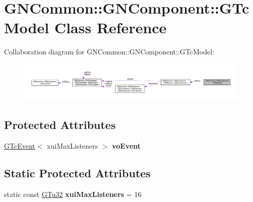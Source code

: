 \hypertarget{class_g_n_common_1_1_g_n_component_1_1_g_tc_model}{}\section{G\+N\+Common\+:\+:G\+N\+Component\+:\+:G\+Tc\+Model Class Reference}
\label{class_g_n_common_1_1_g_n_component_1_1_g_tc_model}


Collaboration diagram for G\+N\+Common\+:\+:G\+N\+Component\+:\+:G\+Tc\+Model\+:\nopagebreak
\begin{figure}[H]
\begin{center}
\leavevmode
\includegraphics[width=350pt]{class_g_n_common_1_1_g_n_component_1_1_g_tc_model__coll__graph}
\end{center}
\end{figure}
\subsection*{Protected Attributes}
\begin{DoxyCompactItemize}
\item 
\mbox{\label{class_g_n_common_1_1_g_n_component_1_1_g_tc_model_a8409e444177e68c91f5d8d6ece61a881}} 
\mbox{\hyperlink{class_g_n_common_1_1_g_n_component_1_1_g_tc_event}{G\+Tc\+Event}}$<$ xui\+Max\+Listeners $>$ {\bfseries vo\+Event}
\end{DoxyCompactItemize}
\subsection*{Static Protected Attributes}
\begin{DoxyCompactItemize}
\item 
\mbox{\label{class_g_n_common_1_1_g_n_component_1_1_g_tc_model_abb113bb12f6c3a8d97f0ced3904c408d}} 
static const \mbox{\hyperlink{namespace_g_n_common_ae5485474bc8f23e462e920a17b377b53}{G\+Tu32}} {\bfseries xui\+Max\+Listeners} = 16
\end{DoxyCompactItemize}


